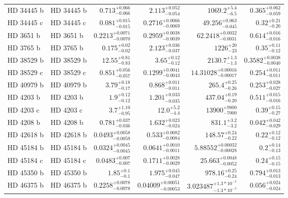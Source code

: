 \begin{longtable*}{llrrrr}
HD 34445 b & HD 34445 b & $0.713^{+0.066}_{-0.066}$ & $2.113^{+0.052}_{-0.054}$ & $1069.2^{+5.4}_{-6.5}$ & $0.365^{+0.062}_{-0.059}$ \\ 
HD 34445 c & HD 34445 c & $0.081^{+0.015}_{-0.015}$ & $0.2716^{+0.0066}_{-0.0069}$ & $49.256^{+0.063}_{-0.045}$ & $0.32^{+0.21}_{-0.20}$ \\ 
HD 3651 b & HD 3651 b & $0.2213^{+0.0071}_{-0.0070}$ & $0.2959^{+0.0038}_{-0.0039}$ & $62.2418^{+0.0032}_{-0.0031}$ & $0.614^{+0.016}_{-0.016}$ \\ 
HD 3765 b & HD 3765 b & $0.175^{+0.02}_{-0.02}$ & $2.123^{+0.036}_{-0.037}$ & $1226^{+20}_{-23}$ & $0.35^{+0.11}_{-0.12}$ \\ 
HD 38529 b & HD 38529 b & $12.55^{+0.81}_{-0.83}$ & $3.65^{+0.12}_{-0.12}$ & $2130.7^{+1.3}_{-1.3}$ & $0.3582^{+0.0038}_{-0.0040}$ \\ 
HD 38529 c & HD 38529 c & $0.851^{+0.056}_{-0.057}$ & $0.1299^{+0.0041}_{-0.0043}$ & $14.31028^{+0.00016}_{-0.00017}$ & $0.254^{+0.011}_{-0.011}$ \\ 
HD 40979 b & HD 40979 b & $3.79^{+0.18}_{-0.17}$ & $0.868^{+0.011}_{-0.011}$ & $265.4^{+0.25}_{-0.26}$ & $0.253^{+0.028}_{-0.027}$ \\ 
HD 4203 b & HD 4203 b & $1.9^{+0.12}_{-0.12}$ & $1.201^{+0.033}_{-0.035}$ & $437.04^{+0.19}_{-0.20}$ & $0.511^{+0.015}_{-0.016}$ \\ 
HD 4203 c & HD 4203 c & $3.7^{+1.10}_{-0.95}$ & $12.0^{+5.2}_{-4.4}$ & $13900^{+9800}_{-7000}$ & $0.39^{+0.15}_{-0.27}$ \\ 
HD 4208 b & HD 4208 b & $0.781^{+0.037}_{-0.036}$ & $1.632^{+0.023}_{-0.024}$ & $831.1^{+3.2}_{-3.2}$ & $0.042^{+0.042}_{-0.029}$ \\ 
HD 42618 b & HD 42618 b & $0.0493^{+0.0058}_{-0.0059}$ & $0.533^{+0.0082}_{-0.0084}$ & $148.57^{+0.24}_{-0.22}$ & $0.22^{+0.12}_{-0.12}$ \\ 
HD 45184 b & HD 45184 b & $0.0324^{+0.0045}_{-0.0045}$ & $0.0641^{+0.0010}_{-0.0011}$ & $5.88552^{+0.00032}_{-0.00028}$ & $0.2^{+0.14}_{-0.13}$ \\ 
HD 45184 c & HD 45184 c & $0.0483^{+0.007}_{-0.007}$ & $0.1711^{+0.0028}_{-0.0029}$ & $25.663^{+0.0048}_{-0.0052}$ & $0.24^{+0.15}_{-0.15}$ \\ 
HD 45350 b & HD 45350 b & $1.85^{+0.1}_{-0.1}$ & $1.975^{+0.045}_{-0.047}$ & $978.16^{+0.25}_{-0.24}$ & $0.794^{+0.013}_{-0.013}$ \\ 
HD 46375 b & HD 46375 b & $0.2258^{+0.0078}_{-0.0078}$ & $0.04009^{+0.00051}_{-0.00053}$ & $3.023487^{+1.3*10^{-5}}_{-1.3*10^{-5}}$ & $0.056^{+0.024}_{-0.024}$ \\ 

\end{longtable*}
